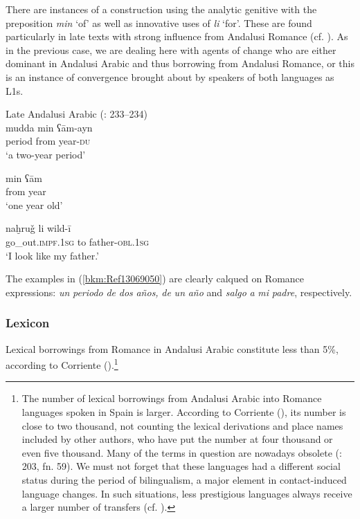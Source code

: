 \documentclass[output=paper,modfonts,nonflat]{langsci/langscibook}
\begin{document}
There are instances of a construction using the analytic genitive with the preposition \textit{min} ‘of’ as well as innovative uses of \textit{li} ‘for’. These are found particularly in late texts with strong influence from Andalusi Romance (cf. \citealt{Corriente2012}). As in the previous case, we are dealing here with agents of change who are either dominant in Andalusi Arabic and thus borrowing from Andalusi Romance, or this is an instance of convergence brought about by speakers of both languages as L1s.


\ea\label{bkm:Ref13069050}
Late Andalusi Arabic (\citealt{CorrientePereiraVicente2015}: 233–234)\\
\ea \gll mudda min ʕām-ayn\\
     period from year-\textsc{du}\\
\glt ‘a two-year period’



\ex
\gll min ʕām\\
     from year\\
\glt ‘one year old’



\ex
\gll naḫruǧ li wild-ī\\
  go\_out.\textsc{impf.1sg} to father-\textsc{obl.1sg}\\
\glt ‘I look like my father.’
\z
\z

The examples in (\ref{bkm:Ref13069050}) are clearly calqued on Romance expressions: \textit{un} \textit{periodo} \textit{de} \textit{dos} \textit{años,} \textit{de} \textit{un} \textit{año} and \textit{salgo} \textit{a} \textit{mi} \textit{padre}, respectively. 
 
\subsubsection{Lexicon}




Lexical borrowings from Romance in Andalusi Arabic constitute less than 5\%, according to Corriente (\citeyear[142]{Corriente1992book}).\footnote{The number of lexical borrowings from Andalusi Arabic into Romance languages spoken in Spain is larger. According to Corriente (\citeyear{Corriente2005}), its number is close to two thousand, not counting the lexical derivations and place names included by other authors, who have put the number at four thousand or even five thousand. Many of the terms in question are nowadays obsolete (\citealt{Corriente2005}: 203, fn. 59). We must not forget that these languages had a different social status during the period of bilingualism, a major element in contact-induced language changes. In such situations, less prestigious languages always receive a larger number of transfers (cf.  \citealt{CorrientePereiraVicente2019}).} 
\end{document}
